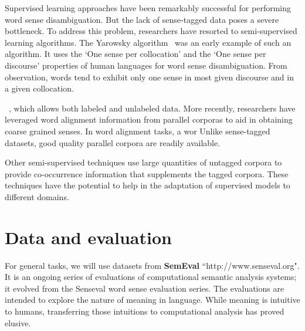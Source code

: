 \documentclass[11pt,letterpaper]{article}
\begin{document}
Supervised learning approaches have been remarkably successful for performing word sense disambiguation. But the lack of sense-tagged data poses a severe bottleneck. To address this problem, researchers have resorted to semi-supervised learning algorithms. The Yarowsky algorithm~\cite{yarowsky1995unsupervised} was an early example of such an algorithm. It uses the `One sense per collocation' and the `One sense per discourse' properties of human languages for word sense disambiguation. From observation, words tend to exhibit only one sense in most given discourse and in a given collocation. 

~\cite{le2008semi}, which allows both labeled and unlabeled data. 
More recently, researchers have leveraged word alignment information from parallel corporas to aid in obtaining coarse grained senses. In word alignment tasks, a wor 
Unlike sense-tagged datasets, good quality parallel corpora are readily available. 


Other semi-supervised techniques use large quantities of untagged corpora to provide co-occurrence information that supplements the tagged corpora. These techniques have the potential to help in the adaptation of supervised models to different domains.


\section*{Data and evaluation}
For general tasks, we will use datasets from \textbf{SemEval} ``http://www.senseval.org". It is an ongoing series of evaluations of computational semantic analysis systems; it evolved from the Senseval word sense evaluation series. The evaluations are intended to explore the nature of meaning in language. While meaning is intuitive to humans, transferring those intuitions to computational analysis has proved elusive.
\end{document}
